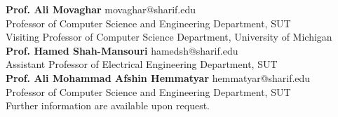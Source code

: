\documentclass[11pt]{article}
\begin{document}
\textbf{Prof. Ali Movaghar} \href{https://scholar.google.com/citations?user=BXNelwwAAAAJ\&hl=en}{\small \faExternalLink} \hfill movaghar@sharif.edu\\
Professor of Computer Science and Engineering Department, SUT \\
Visiting Professor of Computer Science Department, University of Michigan\\
\textbf{Prof. Hamed Shah-Mansouri} \href{https://scholar.google.com/citations?user=dcjIFccAAAAJ&hl=en&oi=ao}{\small \faExternalLink} \hfill  hamedsh@sharif.edu\\
Assistant Professor of Electrical Engineering Department, SUT\\
\textbf{Prof. Ali Mohammad Afshin Hemmatyar} \href{https://scholar.google.com/citations?user=wob0AskAAAAJ&hl=en&oi=ao}{\small \faExternalLink}  \hfill hemmatyar@sharif.edu\\
Professor of Computer Science and Engineering Department, SUT\\
\vfill
Further information are available upon request.
\end{document}
